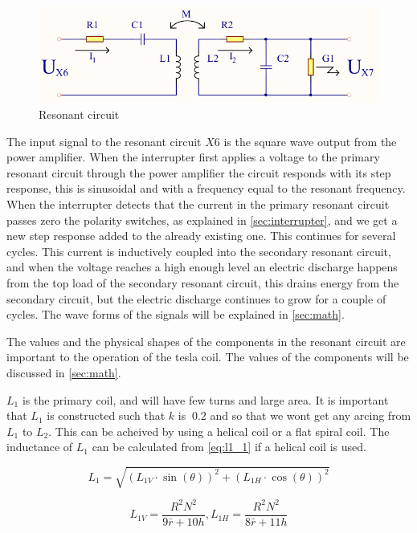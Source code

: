 \begin{figure}[H]
    \centering
    \includegraphics[width=\textwidth]{Skjema/Spolerigg1_r.pdf}
    \caption{Resonant circuit}
    \label{fig:spolerigg1}
\end{figure}

The input signal to the resonant circuit $X6$ is the square wave output from the power amplifier. When the interrupter first applies a voltage to the primary resonant circuit through the power amplifier the circuit responds with its step response, this is sinusoidal and with a frequency equal to the resonant frequency. When the interrupter detects that the current in the primary resonant circuit passes zero the polarity switches, as explained in \cref{sec:interrupter}, and we get a new step response added to the already existing one. This continues for several cycles. This current is inductively coupled into the secondary resonant circuit, and when the voltage reaches a high enough level an electric discharge happens from the top load of the secondary resonant circuit, this drains energy from the secondary circuit, but the electric discharge continues to grow for a couple of cycles. The wave forms of the signals will be explained in \cref{sec:math}.

The values and the physical shapes of the components in the resonant circuit are important to the operation of the tesla coil. The values of the components will be discussed in \cref{sec:math}.

$L_1$ is the primary coil, and will have few turns and large area. It is important that $L_1$ is constructed such that $k$ is $~0.2$ and so that we wont get any arcing from $L_1$ to $L_2$. This can be acheived by using a helical coil or a flat spiral coil. The inductance of $L_1$ can be calculated from \cref{eq:l1_1} if a helical coil is used.

\begin{equation} \label{eq:l1_1}
    L_1 = \sqrt{(L_{1V}\cdot \sin (\theta))^2 + (L_{1H}\cdot \cos (\theta))^2}
\end{equation}

\begin{equation} \label{eq:l1_2}
    L_{1V} = \frac{R^2 N^2}{9 \bar{r} + 10 h}, L_{1H} = \frac{R^2 N^2}{8 \bar{r} + 11 h}
\end{equation}


